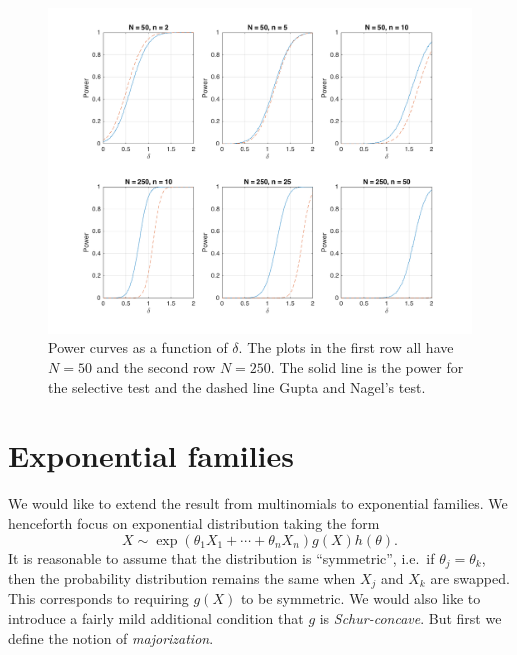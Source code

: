 \documentclass[11pt]{article}
\begin{document}
\begin{figure}[htbp]
\begin{center}
\includegraphics[width = \textwidth, trim = {1.3in 0.7in 1.6in 0.6in}, clip]{plotMultinomialPower}
\end{center}
\caption{Power curves as a function of $\delta$. The plots in the first row all have $N = 50$ and the second row $N = 250$. The solid line is the power for the selective test and the dashed line Gupta and Nagel's test.}
\label{fig:power}
\end{figure}

\section{Exponential families}
\label{sec:exponential_families}

We would like to extend the result from multinomials to exponential families. We henceforth focus on exponential distribution taking the form
\begin{equation}
X \sim \exp\left(\theta_1 X_1 + \cdots + \theta_n X_n\right) g\left(X\right) h\left(\theta\right).
\label{eqn:exp_family}
\end{equation}
It is reasonable to assume that the distribution is ``symmetric'', i.e.\ if $\theta_j = \theta_k$, then the probability distribution remains the same when $X_j$ and $X_k$ are swapped. This corresponds to requiring $g\left(X\right)$ to be symmetric. We would also like to introduce a fairly mild additional condition that $g$ is {\em Schur-concave}. But first we define the notion of {\em majorization}.
\end{document}
